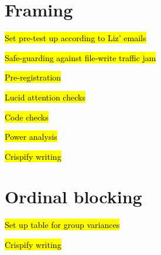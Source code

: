 \documentclass[12pt]{article}
\begin{document}
\section*{Framing}
	\begin{coi}
		\item \hl{Set pre-test up according to Liz' emails}
		\item \hl{Safe-guarding against file-write traffic jam}
		\item \hl{Pre-registration}
		\item \hl{Lucid attention checks}
		\item \hl{Code checks}
		\item \hl{Power analysis}
		\item \hl{Crispify writing}
	\end{coi} 

\section*{Ordinal blocking}
	\begin{coi}
		\item \hl{Set up table for group variances}
		\item \hl{Crispify writing}
	\end{coi}
	

	
\end{document}
